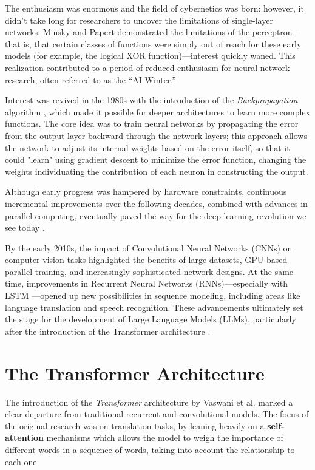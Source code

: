 The enthusiasm was enormous and the field of cybernetics was born: however, it didn’t take long for researchers to uncover the limitations of single-layer networks. Minsky and Papert demonstrated the limitations of the perceptron—that is, that certain classes of functions were simply out of reach for these early models (for example, the logical XOR function)—interest quickly waned. \cite{minsky1969perceptrons}
This realization contributed to a period of reduced enthusiasm for neural network research, often referred to as the “AI Winter.”

Interest was revived in the 1980s with the introduction of the \textit{Backpropagation} algorithm \cite{rumelhart1986learning}, which made it possible for deeper architectures to learn more complex functions. The core idea was to train neural networks by propagating the error from the output layer backward through the network layers; this approach allows the network to adjust its internal weights based on the error itself, so that it could "learn" using gradient descent to minimize the error function, changing the weights individuating the contribution of each neuron in constructing the output.

Although early progress was hampered by hardware constraints, continuous incremental improvements over the following decades, combined with advances in parallel computing, eventually paved the way for the deep learning revolution we see today \cite{goodfellow2016deep}.

By the early 2010s, the impact of Convolutional Neural Networks (CNNs) on computer vision tasks \cite{krizhevsky2012imagenet} highlighted the benefits of large datasets, GPU-based parallel training, and increasingly sophisticated network designs. At the same time, improvements in Recurrent Neural Networks (RNNs)—especially with LSTM \cite{hochreiter1997long}—opened up new possibilities in sequence modeling, including areas like language translation and speech recognition. These advancements ultimately set the stage for the development of Large Language Models (LLMs), particularly after the introduction of the Transformer architecture \cite{vaswani2017attention}.


\section{The Transformer Architecture}
\label{sec:transformer-architecture}

The introduction of the \textit{Transformer} architecture by Vaswani et al. \cite{vaswani2017attention} marked a clear departure from traditional recurrent and convolutional models. The focus of the original research was on translation tasks, by leaning heavily on a \textbf{self-attention} mechanisms which allows the model to weigh the importance of different words in a sequence of words, taking into account the relationship to each one.

